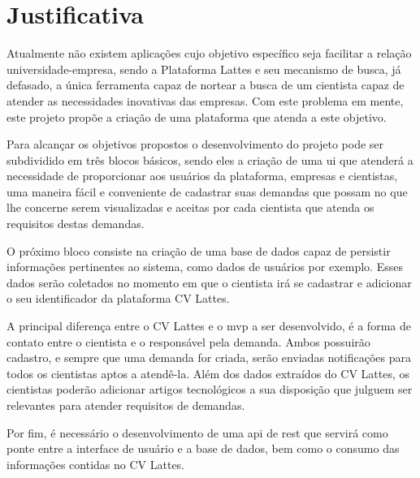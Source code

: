 \section{Justificativa}\label{sec:justificativa}

Atualmente não existem aplicações cujo objetivo específico seja facilitar a relação universidade-empresa, sendo a Plataforma Lattes e seu mecanismo de busca, já defasado, a única ferramenta capaz de nortear a busca de um cientista capaz de atender as necessidades inovativas das empresas. Com este problema em mente, este projeto propõe a criação de uma plataforma que atenda a este objetivo.

Para alcançar os objetivos propostos o desenvolvimento do projeto pode ser subdividido em três blocos básicos, sendo eles a criação de uma \gls{ui} que atenderá a necessidade de proporcionar aos usuários da plataforma, empresas e cientistas, uma maneira fácil e conveniente de cadastrar suas demandas que possam no que lhe concerne serem visualizadas e aceitas por cada cientista que atenda os requisitos destas demandas.

O próximo bloco consiste na criação de uma base de dados capaz de persistir informações pertinentes ao sistema, como dados de usuários por exemplo. Esses dados serão coletados no momento em que o cientista irá se cadastrar e adicionar o seu identificador da plataforma CV Lattes.

A principal diferença entre o CV Lattes e o \gls{mvp} a ser desenvolvido, é a forma de contato entre o cientista e o responsável pela demanda. Ambos possuirão cadastro, e sempre que uma demanda for criada, serão enviadas notificações para todos os cientistas aptos a atendê-la. Além dos dados extraídos do CV Lattes, os cientistas poderão adicionar artigos tecnológicos a sua disposição que julguem ser relevantes para atender requisitos de demandas.

Por fim, é necessário o desenvolvimento de uma \gls{api} de \gls{rest} que servirá como ponte entre a interface de usuário e a base de dados, bem como o consumo das informações contidas no CV Lattes.



